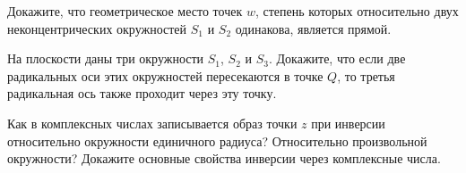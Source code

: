 \documentclass[a4paper, 12pt, num=23]{listok}
\begin{document}
\begin{problem}
	Докажите, что геометрическое место точек $w$, степень которых относительно двух неконцентрических окружностей $S_1$ и $S_2$ одинакова, является прямой.
\end{problem}
\begin{problem}
	На плоскости даны три окружности $S_1$, $S_2$ и $S_3$.
	Докажите, что если две радикальных оси этих окружностей пересекаются в точке $Q$, то третья радикальная ось также проходит через эту точку.
\end{problem}
\begin{problem}
	Как в комплексных числах записывается образ точки $z$ при инверсии относительно окружности единичного радиуса?
	Относительно произвольной окружности? Докажите основные свойства инверсии через комплексные числа.
\end{problem}
\end{document}
